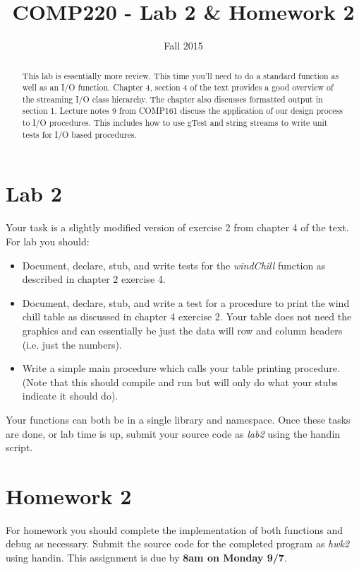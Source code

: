 \documentclass[10pt]{article}
\title{COMP220 - Lab 2 \& Homework 2}
\author{ }
\date{Fall 2015}
\begin{document}
\maketitle

\begin{abstract}
This lab is essentially more review. This time you'll need to do a standard function as well as an I/O function. Chapter 4, section 4 of the text provides a good overview of the streaming I/O class hierarchy. The chapter also discusses formatted output in section 1. Lecture notes 9 from COMP161 discuss the application of our design process to I/O procedures.  This includes how to use gTest and string streams to write unit tests for I/O based procedures. 
\end{abstract}

\section{Lab 2}

Your task is a slightly modified version of exercise 2 from chapter 4 of the text. For lab you should:
\begin{itemize}
\item Document, declare, stub, and write tests for the \textit{windChill} function as described in chapter 2 exercise 4.
\item Document, declare, stub, and write a test for a procedure to print the wind chill table as discussed in chapter 4 exercise 2. Your table does not need the graphics and can essentially be just the data will row and column headers (i.e. just the numbers). 
\item Write a simple main procedure which calls your table printing procedure. (Note that this should compile and run but will only do what your stubs indicate it should do).
\end{itemize}
Your functions can both be in a single library and namespace. Once these tasks are done, or lab time is up, submit your source code as \textit{lab2} using the handin script. 

\section{Homework 2}

For homework you should complete the implementation of both functions and debug as necessary. Submit the source code for the completed program as \textit{hwk2} using handin. This assignment is due by \textbf{8am on Monday 9/7}.
\end{document}

